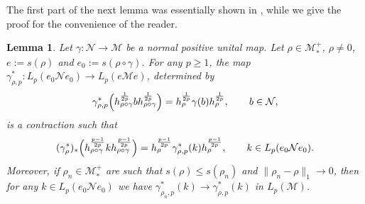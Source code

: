 \documentclass[12pt]{article}
\newtheorem{lemma}[theorem]{Lemma}
\theoremstyle{definition}
\theoremstyle{remark}
\numberwithin{equation}{section}
\def\Me{\mathcal M}
\def\Ne{\mathcal N}
\begin{document}
{\color{red}The first part of the next lemma was essentially shown in
\cite[Proposition 3.12]{jencova2018renyi}, while we give the proof for the convenience of the reader.}

\begin{lemma}\label{lemma:pcontraction} Let $\gamma:\Ne\to \Me$ be a normal positive unital map.
Let $\rho\in \Me_*^+$, {\color{red}$\rho\ne0$,} $e:=s(\rho)$ and $e_0:=s(\rho\circ\gamma)$. For any
$p\ge 1$, the map $\gamma^*_{\rho,p}:L_p(e_0 \Ne e_0)\to L_p(e\Me e)$, determined by
\begin{align}\label{gamma-rho-p1}
\gamma^*_{\rho,p}\Bigl(h_{\rho\circ\gamma}^{1\over 2p}bh^{1\over2p}_{\rho\circ\gamma}\Bigr)
=h_\rho^{1\over 2p}\gamma(b) h_\rho^{1\over 2p},\qquad b\in \Ne,
\end{align}
is a contraction such that 
\begin{align}\label{gamma-rho-p2}
(\gamma^*_\rho)_*\Bigl(h_{\rho\circ\gamma}^{p-1\over 2p}k
h_{\rho\circ\gamma}^{p-1\over2p}\Bigr)
=h_\rho^{p-1\over 2p}\gamma^*_{\rho,p}(k)h_\rho^{p-1\over 2p},\qquad
k\in L_p(e_0 \Ne e_0).
\end{align}
Moreover, if $\rho_n\in \Me_*^+$ are such that $s(\rho)\le s(\rho_n)$ and
$\|\rho_n-\rho\|_1\to 0$, then for any $k\in L_p(e_0 \Ne e_0)$ we have
$\gamma^*_{\rho_n,p}(k)\to \gamma^*_{\rho,p}(k)$ in $L_p(\Me)$.

\end{lemma}
\end{document}
